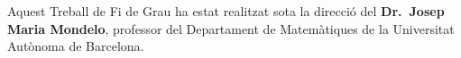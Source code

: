 \documentclass[twoside]{article}
\begin{document}
Aquest Treball de Fi de Grau ha estat realitzat sota la direcció del \textbf{Dr.\ Josep Maria Mondelo}, professor del Departament de Matemàtiques de la Universitat Autònoma de Barcelona.
\thispagestyle{empty}
\end{document}
